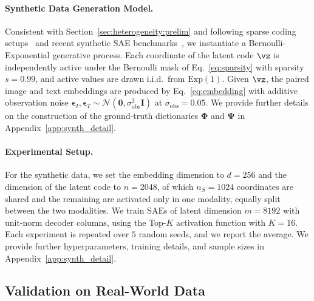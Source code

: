 \paragraph{Synthetic Data Generation Model.}
Consistent with Section~\ref{sec:heterogeneity:prelim} and following sparse coding setups~\citep{goodfellow2012large, sheikh2014truncated} and recent synthetic SAE benchmarks~\citep{chanin2026synthsaebench}, we instantiate a Bernoulli-Exponential generative process.
Each coordinate of the latent code $\vz$ is independently active under the Bernoulli mask of Eq.~\eqref{eq:sparsity} with sparsity $s = 0.99$, and active values are drawn i.i.d.\ from $\mathrm{Exp}(1)$.
Given $\vz$, the paired image and text embeddings are produced by Eq.~\eqref{eq:embedding} with additive observation noise $\boldsymbol\epsilon_I, \boldsymbol\epsilon_T \sim \mathcal{N}(\boldsymbol{0}, \sigma_{\mathrm{obs}}^2 \mathbf{I})$ at $\sigma_{\mathrm{obs}} = 0.05$.
We provide further details on the construction of the ground-truth dictionaries $\boldsymbol\Phi$ and $\boldsymbol\Psi$ in Appendix~\ref{app:synth_detail}.

\paragraph{Experimental Setup.}
For the synthetic data, we set the embedding dimension to $d = 256$ and the dimension of the latent code to $n = 2048$, of which $n_S = 1024$ coordinates are shared and the remaining are activated only in one modality, equally split between the two modalities.
We train SAEs of latent dimension $m = 8192$ with unit-norm decoder columns, using the Top-$K$ activation function with $K = 16$.
Each experiment is repeated over $5$ random seeds, and we report the average.
We provide further hyperparameters, training details, and sample sizes in Appendix~\ref{app:synth_detail}.



\subsection{Validation on Real-World Data}
\label{subsec:real_exp}

